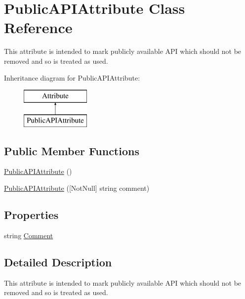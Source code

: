 \hypertarget{class_public_a_p_i_attribute}{}\section{Public\+A\+P\+I\+Attribute Class Reference}
\label{class_public_a_p_i_attribute}


This attribute is intended to mark publicly available A\+PI which should not be removed and so is treated as used.  


Inheritance diagram for Public\+A\+P\+I\+Attribute\+:\begin{figure}[H]
\begin{center}
\leavevmode
\includegraphics[height=2.000000cm]{class_public_a_p_i_attribute}
\end{center}
\end{figure}
\subsection*{Public Member Functions}
\begin{DoxyCompactItemize}
\item 
\mbox{\hyperlink{class_public_a_p_i_attribute_a16e001e17bbe24c0a42b305d6a96e915}{Public\+A\+P\+I\+Attribute}} ()
\item 
\mbox{\hyperlink{class_public_a_p_i_attribute_ab00ffb9ccf468541a8f81f85fdee678a}{Public\+A\+P\+I\+Attribute}} (\mbox{[}Not\+Null\mbox{]} string comment)
\end{DoxyCompactItemize}
\subsection*{Properties}
\begin{DoxyCompactItemize}
\item 
string \mbox{\hyperlink{class_public_a_p_i_attribute_a4488351c8b5d0090c2bf8d69380acf6a}{Comment}}
\end{DoxyCompactItemize}


\subsection{Detailed Description}
This attribute is intended to mark publicly available A\+PI which should not be removed and so is treated as used. 



